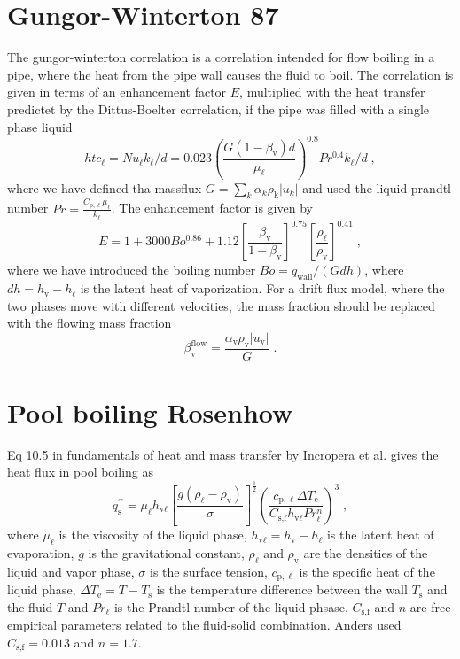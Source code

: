 \documentclass{article}
\begin{document}
\section{Gungor-Winterton 87}
The gungor-winterton correlation is a correlation intended for flow boiling in a pipe, where the heat from the pipe wall causes the fluid to boil. The correlation is given in terms of an enhancement factor $E$, multiplied with the heat transfer predictet by the Dittus-Boelter correlation, if the pipe was filled with a single phase liquid
\begin{equation}
    htc_{\ell} = Nu_{\ell} k_{\ell} / d = 0.023 \left(\frac{G  \left(1 - \beta_{\text{v}}\right) d}{\mu_{\ell}} \right)^{0.8} Pr^{0.4} k_{\ell} / d\;,
\end{equation}
where we have defined tha massflux $G = \sum_{k} \alpha_{k} \rho_{\text{k}} \left| u_{k}\right|$ and used the liquid prandtl number $Pr = \frac{C_{\text{p},\ell} \mu_{\ell}}{k_{\ell}}$. The enhancement factor is given by
\begin{equation}
    E = 1 + 3000Bo^{0.86} + 1.12 \left[\frac{\beta_{\text{v}}}{1-\beta_{\text{v}}}\right]^{0.75} \left[ \frac{\rho_{\ell}}{\rho_{\text{v}}} \right]^{0.41}\;,
    \label{eq:gw87}
\end{equation}
where we have introduced the boiling number $Bo =  q_{\text{wall}} / ( G dh)$, where $dh = h_{\text{v}} - h_{\ell}$ is the latent heat of vaporization. For a drift flux model, where the two phases move with different velocities, the mass fraction should be replaced with the flowing mass fraction
\begin{equation}
    \beta_{\text{v}}^{\text{flow}} = \frac{\alpha_{\text{v}} \rho_{\text{v}} \left| u_{\text{v}} \right|}{G}\;.
\end{equation}

\section{Pool boiling Rosenhow}
Eq 10.5 in fundamentals of heat and mass transfer by Incropera et al. gives the heat flux in pool boiling as
\begin{equation}
    q_{\text{s}}^{\prime\prime} = \mu_{\ell} h_{\text{v}\ell} \left[\frac{g\left( \rho_{\ell} - \rho_{\text{v}} \right)}{\sigma}\right]^{\frac{1}{2}} \left( \frac{c_{\text{p},\ell}\Delta T_{\text{e}}}{{C_{\text{s,f}}h_{\text{v}\ell}} Pr_{\ell}^n} \right)^{3}\;,
\end{equation}
where $\mu_{\ell}$ is the viscosity of the liquid phase, $h_{\text{v}\ell} = h_{\text{v}} - h_{\ell}$ is the latent heat of evaporation, $g$ is the gravitational constant, $\rho_{\ell}$ and $\rho_{\text{v}}$ are the densities of the liquid and vapor phase, $\sigma$ is the surface tension, $c_{\text{p},\ell}$ is the specific heat of the liquid phase, $\Delta T_{\text{e}} = T - T_{\text{s}}$ is the temperature difference between the wall $T_{\text{s}}$ and the fluid $T$ and $Pr_{\ell}$ is the Prandtl number of the liquid phsase. $C_{\text{s,f}}$ and $n$ are free empirical parameters related to the fluid-solid combination. Anders used $C_{\text{s,f}} = 0.013$ and $n=1.7$. 
\end{document}
